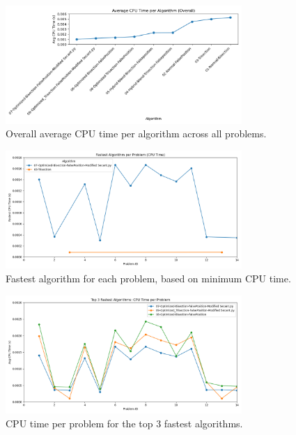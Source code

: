 \documentclass[11pt,a4paper]{article}
\begin{document}
\begin{figure}[H]
    \centering
    \includegraphics[width=0.8\textwidth]{avg_cpu_time_lineplot_overall.png}
    \caption{Overall average CPU time per algorithm across all problems.}
    \label{fig:avg_cpu_time_lineplot_overall}
\end{figure}

\begin{figure}[H]
    \centering
    \includegraphics[width=0.8\textwidth]{fastest_algorithm_per_problem_lineplot.png}
    \caption{Fastest algorithm for each problem, based on minimum CPU time.}
    \label{fig:fastest_algorithm_per_problem}
\end{figure}

\begin{figure}[H]
    \centering
    \includegraphics[width=0.8\textwidth]{top3_fastest_algorithms_lineplot.png}
    \caption{CPU time per problem for the top 3 fastest algorithms.}
    \label{fig:top3_fastest_algorithms}
\end{figure}
\end{document}
